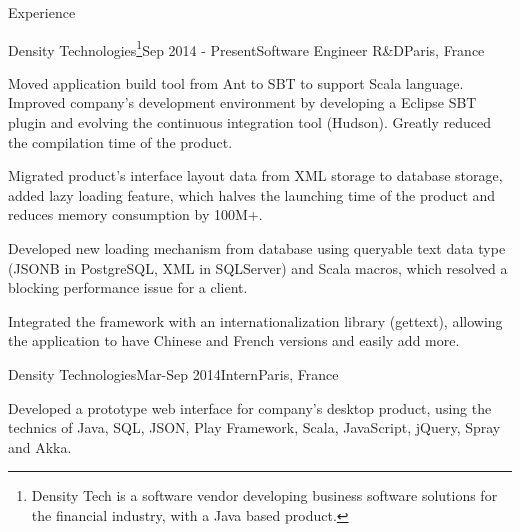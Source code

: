 \documentclass{resume} %
\begin{document}

\begin{rSection}{Experience}

\begin{rSubsection}{Density Technologies\footnote{Density Tech is a software vendor developing business software solutions for the financial industry, with a Java based product.}}{Sep 2014 - Present}{Software Engineer R\&D}{Paris, France}
\item Moved application build tool from Ant to SBT to support Scala language. Improved company's development environment by developing a Eclipse SBT plugin and evolving the continuous integration tool (Hudson). Greatly reduced the compilation time of the product.
\item Migrated product's interface layout data from XML storage to database storage, added lazy loading feature, which halves the launching time of the product and reduces memory consumption by 100M+.
\item Developed new loading mechanism from database using queryable text data type (JSONB in PostgreSQL, XML in SQLServer) and Scala macros, which resolved a blocking performance issue for a client.
\item Integrated the framework with an internationalization library (gettext), allowing the application to have Chinese and French versions and easily add more.
\end{rSubsection}

\begin{rSubsection}{Density Technologies}{Mar-Sep 2014}{Intern}{Paris, France}
\item Developed a prototype web interface for company's desktop product, using the technics of Java, SQL, JSON, Play Framework, Scala, JavaScript, jQuery, Spray and Akka.
\end{rSubsection}

\end{rSection}


 
\end{document}

